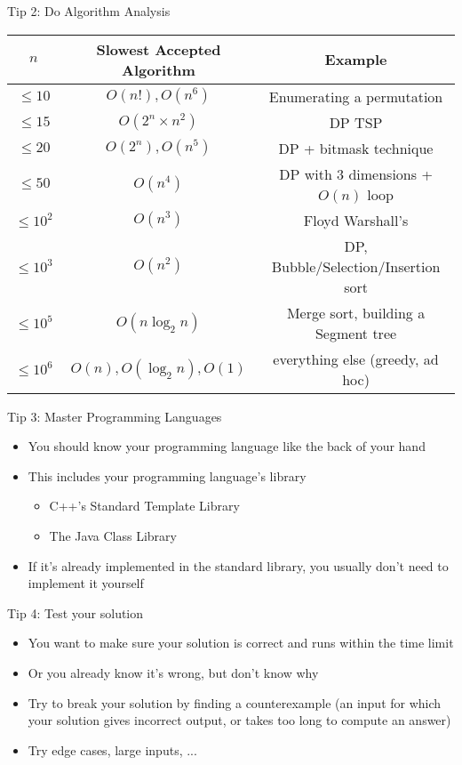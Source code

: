 \documentclass[12pt,t]{beamer}
\newcommand{\bi}{\begin{itemize}}
\newcommand{\ei}{\end{itemize}}
\begin{document}
\begin{frame}{Tip 2: Do Algorithm Analysis}

\vspace{50pt}

{
    \tiny
    \begin{center}
    \begin{tabular}{c|c|c}
        $n$ & Slowest Accepted Algorithm & Example \\
        \hline
        $\leq 10$ & $O(n!), O(n^6)$ & Enumerating a permutation \\
        $\leq 15$ & $O(2^n\times n^2)$ & DP TSP \\
        $\leq 20$ & $O(2^n), O(n^5)$ & DP + bitmask technique \\
        $\leq 50$ & $O(n^4)$ & DP with 3 dimensions + $O(n)$ loop\\
        $\leq 10^2$ & $O(n^3)$ & Floyd Warshall's \\
        $\leq 10^3$ & $O(n^2)$ & DP, Bubble/Selection/Insertion sort \\
        $\leq 10^5$ & $O(n\log_2{n})$ & Merge sort, building a Segment tree \\
        $\leq 10^6$ & $O(n), O(\log_2{n}), O(1)$ & everything else (greedy, ad hoc) \\
    \end{tabular}
    \end{center}
}

\end{frame}

\begin{frame}{Tip 3: Master Programming Languages}
    \vspace{40pt}

    \bi
        \item You should know your programming language like the back of your hand
        \item This includes your programming language's library
            \bi
                \item C++'s Standard Template Library
                \item The Java Class Library
            \ei
        \item If it's already implemented in the standard library, you usually don't need to implement it yourself
    \ei
\end{frame}

\begin{frame}{Tip 4: Test your solution}
    \vspace{30pt}
    \bi
        \item You want to make sure your solution is correct and runs within the time limit
        \item Or you already know it's wrong, but don't know why
        \vspace{10pt}
        \item Try to break your solution by finding a counterexample (an input for which your solution gives incorrect output, or takes too long to compute an answer)
        \item Try edge cases, large inputs, ...
    \ei
\end{frame}
\end{document}
